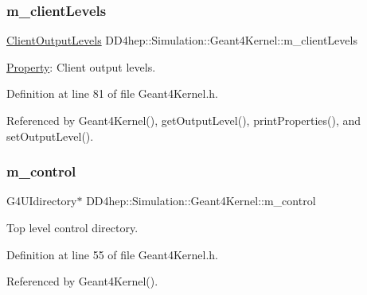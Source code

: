 \subsubsection{\texorpdfstring{m\+\_\+client\+Levels}{m\_clientLevels}}
{\footnotesize\ttfamily \hyperlink{class_d_d4hep_1_1_simulation_1_1_geant4_kernel_a259066f5e9a56bdbfc9718a2b42b8b06}{Client\+Output\+Levels} D\+D4hep\+::\+Simulation\+::\+Geant4\+Kernel\+::m\+\_\+client\+Levels\hspace{0.3cm}{\ttfamily [protected]}}



\hyperlink{class_d_d4hep_1_1_property}{Property}\+: Client output levels. 



Definition at line 81 of file Geant4\+Kernel.\+h.



Referenced by Geant4\+Kernel(), get\+Output\+Level(), print\+Properties(), and set\+Output\+Level().

\hypertarget{class_d_d4hep_1_1_simulation_1_1_geant4_kernel_a1b097ce042c194b7fc041c3457868c2c}{}\label{class_d_d4hep_1_1_simulation_1_1_geant4_kernel_a1b097ce042c194b7fc041c3457868c2c} 
\subsubsection{\texorpdfstring{m\+\_\+control}{m\_control}}
{\footnotesize\ttfamily G4\+U\+Idirectory$\ast$ D\+D4hep\+::\+Simulation\+::\+Geant4\+Kernel\+::m\+\_\+control\hspace{0.3cm}{\ttfamily [protected]}}



Top level control directory. 



Definition at line 55 of file Geant4\+Kernel.\+h.



Referenced by Geant4\+Kernel().

\hypertarget{class_d_d4hep_1_1_simulation_1_1_geant4_kernel_a1019ec87b302f798f36361dd9be8b40a}{}\label{class_d_d4hep_1_1_simulation_1_1_geant4_kernel_a1019ec87b302f798f36361dd9be8b40a} 

